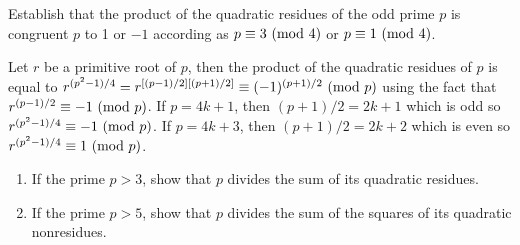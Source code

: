 \begin{exercise}
    Establish that the product of the quadratic residues of the odd prime $p$ is congruent $p$ to 1 or $-1$ according as $p \equiv 3 \ (\mathrm{mod}\ 4)$ or $p \equiv 1 \ (\mathrm{mod}\ 4)$.  \\
\end{exercise}

\begin{solution}
    Let $r$ be a primitive root of $p$, then the product of the quadratic residues of $p$ is equal to $r^{(p^2 - 1)/4} = r^{[(p-1)/2][(p+1)/2]} \equiv (-1)^{(p+1)/2} \ (\mathrm{mod}\ p)$ using the fact that $r^{(p-1)/2} \equiv -1 \ (\mathrm{mod}\ p)$. If $p = 4k+1$, then $(p+1)/2 = 2k+1$ which is odd so $r^{(p^2 - 1)/4} \equiv -1 \ (\mathrm{mod}\ p)$. If $p = 4k+3$, then $(p+1)/2 = 2k+2$ which is even so $r^{(p^2 - 1)/4} \equiv 1 \ (\mathrm{mod}\ p)$. \\
\end{solution}

\begin{exercise}
    \begin{enumerate}
        \item If the prime $p > 3$, show that $p$ divides the sum of its quadratic residues.
        \item If the prime $p > 5$, show that $p$ divides the sum of the squares of its quadratic nonresidues.\\
    \end{enumerate}
\end{exercise}

